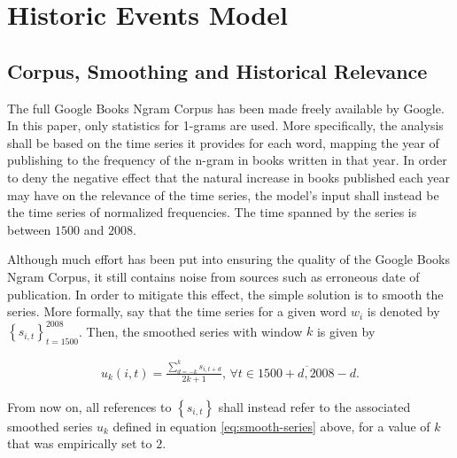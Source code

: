 
\chapter{Historic Events Model}
\label{chapter:hist-ev-model}

\section{Corpus, Smoothing and Historical Relevance}
\label{sec:corpus-smoothing-relevance}

The full Google Books Ngram Corpus has been made freely available by Google. In this paper, only statistics for 1-grams are used. More specifically, the analysis shall be based on the time series it provides for each word, mapping the year of publishing to the frequency of the n-gram in books written in that year. In order to deny the negative effect that the natural increase in books published each year may have on the relevance of the time series, the model's input shall instead be the time series of normalized frequencies. The time spanned by the series is between $1500$ and $2008$.

Although much effort has been put into ensuring the quality of the Google Books Ngram Corpus, it still contains noise from sources such as erroneous date of publication. In order to mitigate this effect, the simple solution is to smooth the series. More formally, say that the time series for a given word $w_i$ is denoted by $\left\{ s_{i, t} \right\}_{t = 1500}^{2008}$. Then, the smoothed series with window $k$ is given by

\begin{align}
\label{eq:smooth-series}
u_{k} \left( i, t \right) = \frac{\sum_{d = -k}^{k} s_{i, t + d}}{2k + 1}, \, \forall t \in \overline{1500 + d, 2008 - d}.
\end{align}

From now on, all references to $\left\{ s_{i, t} \right\}$ shall instead refer to the associated smoothed series $u_k$ defined in equation \eqref{eq:smooth-series} above, for a value of $k$ that was empirically set to $2$.

